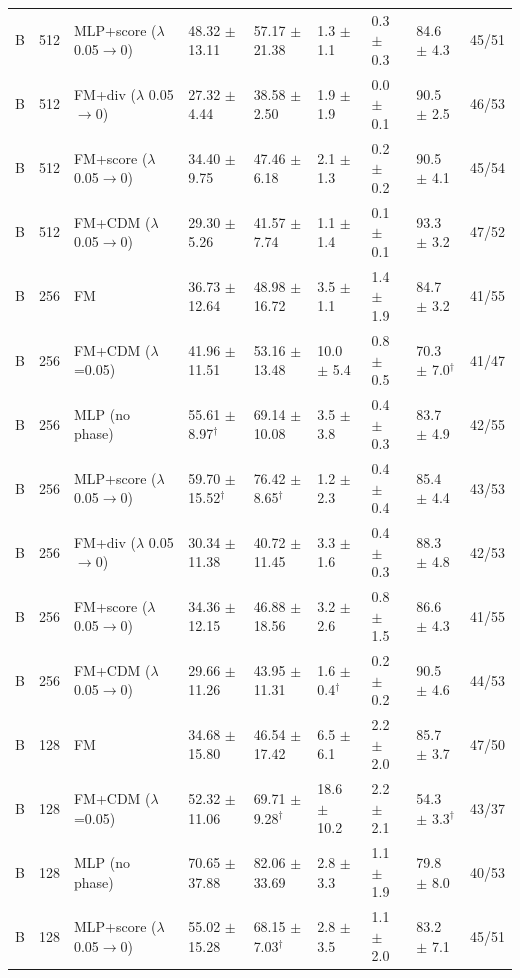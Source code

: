 \begin{tabular}{lllllllll}
B & 512 & MLP+score ($\lambda$ 0.05$\to$0) & 48.32 $\pm$ 13.11 & 57.17 $\pm$ 21.38 & 1.3 $\pm$ 1.1 & 0.3 $\pm$ 0.3 & 84.6 $\pm$ 4.3 & 45/51 \\
B & 512 & FM+div ($\lambda$ 0.05$\to$0) & 27.32 $\pm$ 4.44 & 38.58 $\pm$ 2.50 & 1.9 $\pm$ 1.9 & 0.0 $\pm$ 0.1 & 90.5 $\pm$ 2.5 & 46/53 \\
B & 512 & FM+score ($\lambda$ 0.05$\to$0) & 34.40 $\pm$ 9.75 & 47.46 $\pm$ 6.18 & 2.1 $\pm$ 1.3 & 0.2 $\pm$ 0.2 & 90.5 $\pm$ 4.1 & 45/54 \\
B & 512 & FM+CDM ($\lambda$ 0.05$\to$0) & 29.30 $\pm$ 5.26 & 41.57 $\pm$ 7.74 & 1.1 $\pm$ 1.4 & 0.1 $\pm$ 0.1 & 93.3 $\pm$ 3.2 & 47/52 \\
B & 256 & FM & 36.73 $\pm$ 12.64 & 48.98 $\pm$ 16.72 & 3.5 $\pm$ 1.1 & 1.4 $\pm$ 1.9 & 84.7 $\pm$ 3.2 & 41/55 \\
B & 256 & FM+CDM ($\lambda$=0.05) & 41.96 $\pm$ 11.51 & 53.16 $\pm$ 13.48 & 10.0 $\pm$ 5.4 & 0.8 $\pm$ 0.5 & 70.3 $\pm$ 7.0$^\dagger$ & 41/47 \\
B & 256 & MLP (no phase) & 55.61 $\pm$ 8.97$^\dagger$ & 69.14 $\pm$ 10.08 & 3.5 $\pm$ 3.8 & 0.4 $\pm$ 0.3 & 83.7 $\pm$ 4.9 & 42/55 \\
B & 256 & MLP+score ($\lambda$ 0.05$\to$0) & 59.70 $\pm$ 15.52$^\dagger$ & 76.42 $\pm$ 8.65$^\dagger$ & 1.2 $\pm$ 2.3 & 0.4 $\pm$ 0.4 & 85.4 $\pm$ 4.4 & 43/53 \\
B & 256 & FM+div ($\lambda$ 0.05$\to$0) & 30.34 $\pm$ 11.38 & 40.72 $\pm$ 11.45 & 3.3 $\pm$ 1.6 & 0.4 $\pm$ 0.3 & 88.3 $\pm$ 4.8 & 42/53 \\
B & 256 & FM+score ($\lambda$ 0.05$\to$0) & 34.36 $\pm$ 12.15 & 46.88 $\pm$ 18.56 & 3.2 $\pm$ 2.6 & 0.8 $\pm$ 1.5 & 86.6 $\pm$ 4.3 & 41/55 \\
B & 256 & FM+CDM ($\lambda$ 0.05$\to$0) & 29.66 $\pm$ 11.26 & 43.95 $\pm$ 11.31 & 1.6 $\pm$ 0.4$^\dagger$ & 0.2 $\pm$ 0.2 & 90.5 $\pm$ 4.6 & 44/53 \\
B & 128 & FM & 34.68 $\pm$ 15.80 & 46.54 $\pm$ 17.42 & 6.5 $\pm$ 6.1 & 2.2 $\pm$ 2.0 & 85.7 $\pm$ 3.7 & 47/50 \\
B & 128 & FM+CDM ($\lambda$=0.05) & 52.32 $\pm$ 11.06 & 69.71 $\pm$ 9.28$^\dagger$ & 18.6 $\pm$ 10.2 & 2.2 $\pm$ 2.1 & 54.3 $\pm$ 3.3$^\dagger$ & 43/37 \\
B & 128 & MLP (no phase) & 70.65 $\pm$ 37.88 & 82.06 $\pm$ 33.69 & 2.8 $\pm$ 3.3 & 1.1 $\pm$ 1.9 & 79.8 $\pm$ 8.0 & 40/53 \\
B & 128 & MLP+score ($\lambda$ 0.05$\to$0) & 55.02 $\pm$ 15.28 & 68.15 $\pm$ 7.03$^\dagger$ & 2.8 $\pm$ 3.5 & 1.1 $\pm$ 2.0 & 83.2 $\pm$ 7.1 & 45/51 \\

\end{tabular}
